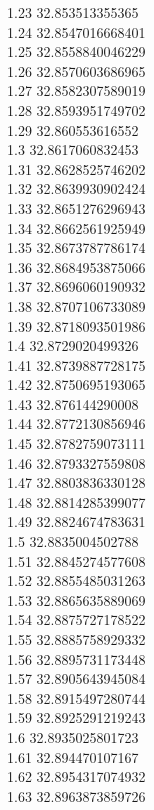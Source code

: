 {1.23	32.853513355365\\
1.24	32.8547016668401\\
1.25	32.8558840046229\\
1.26	32.8570603686965\\
1.27	32.8582307589019\\
1.28	32.8593951749702\\
1.29	32.860553616552\\
1.3	32.8617060832453\\
1.31	32.8628525746202\\
1.32	32.8639930902424\\
1.33	32.8651276296943\\
1.34	32.8662561925949\\
1.35	32.8673787786174\\
1.36	32.8684953875066\\
1.37	32.8696060190932\\
1.38	32.8707106733089\\
1.39	32.8718093501986\\
1.4	32.8729020499326\\
1.41	32.8739887728175\\
1.42	32.8750695193065\\
1.43	32.876144290008\\
1.44	32.8772130856946\\
1.45	32.8782759073111\\
1.46	32.8793327559808\\
1.47	32.8803836330128\\
1.48	32.8814285399077\\
1.49	32.8824674783631\\
1.5	32.8835004502788\\
1.51	32.8845274577608\\
1.52	32.8855485031263\\
1.53	32.8865635889069\\
1.54	32.8875727178522\\
1.55	32.8885758929332\\
1.56	32.8895731173448\\
1.57	32.8905643945084\\
1.58	32.8915497280744\\
1.59	32.8925291219243\\
1.6	32.8935025801723\\
1.61	32.894470107167\\
1.62	32.8954317074932\\
1.63	32.8963873859726\\
}
